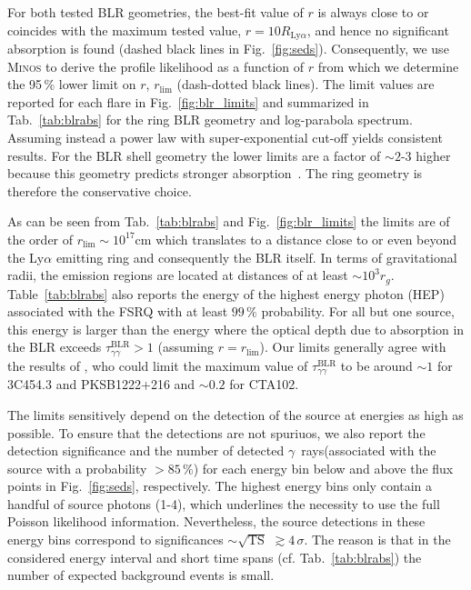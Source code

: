 \documentclass[twocolumn,linenumbers]{aastex62}
\newcommand{\Grays}{$\gamma$~rays\xspace}
\begin{document}
For both tested BLR geometries, the best-fit value of $r$ is always close to or coincides with the maximum tested value, $r = 10R_{\mathrm{Ly}\alpha}$, and hence no significant absorption is found (dashed black lines in Fig.~\ref{fig:seds}). Consequently,  we use \textsc{Minos} to derive the profile likelihood as a function of $r$ from which we determine the 95\,\% lower limit on $r$, $r_\mathrm{lim}$ (dash-dotted black lines). 
The limit values are reported for each flare in Fig.~\ref{fig:blr_limits} and  summarized in Tab.~\ref{tab:blrabs} for the ring BLR geometry and log-parabola spectrum.
Assuming instead a power law with super-exponential cut-off yields consistent results. 
For the BLR shell geometry the lower limits are a factor of $\sim2$-$3$ higher because this geometry predicts stronger absorption~\citep{finke2016}. The ring geometry is therefore the conservative choice. 

As can be seen from Tab.~\ref{tab:blrabs} and Fig.~\ref{fig:blr_limits} the limits are of the order of $r_\mathrm{lim}\sim10^{17}$cm which translates to a distance close to or even beyond the Ly$\alpha$ emitting ring and consequently the BLR itself. In terms of gravitational radii, the emission regions are located at distances of at least $\sim10^3r_g$. 
Table~\ref{tab:blrabs} also reports the energy of the highest energy photon (HEP) associated with the FSRQ with at least $99\,\%$ probability. For all but one source, this energy is larger than the energy where the optical depth due to absorption in the BLR exceeds $\tau_{\gamma\gamma}^\mathrm{BLR} > 1$ (assuming $r = r_\mathrm{lim}$).
Our limits generally agree with the results of \citet{2018MNRAS.477.4749C}, who could limit the maximum value of $\tau_{\gamma\gamma}^\mathrm{BLR}$ to be around $\sim 1$ for 3C454.3 and PKSB1222+216 and $\sim 0.2$ for CTA102. 

The limits sensitively depend on the detection of the source at energies as high as possible. To ensure that the detections are not spuriuos, we also report the detection significance and the number of detected \Grays (associated with the source with a probability $>85\,\%$) for each energy bin below and above the flux points in Fig.~\ref{fig:seds}, respectively. The highest energy bins only contain a handful of source photons (1-4), which underlines the necessity to use the full Poisson likelihood information. 
Nevertheless, the source detections in these energy bins correspond to significances $\sim \sqrt{\mathrm{TS}}$ $\gtrsim 4\,\sigma$.
The reason is that in the considered energy interval and short time spans (cf. Tab.~\ref{tab:blrabs}) the number of expected background events is small. 
\end{document}
